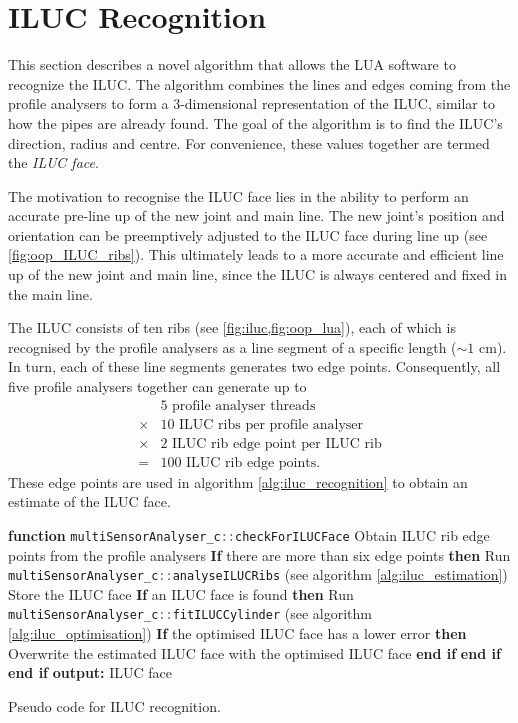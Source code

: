 \section{ILUC Recognition} \label{sec:iluc_recognition}
This section describes a novel algorithm that allows the LUA software to recognize the ILUC. The algorithm combines the lines and edges coming from the profile analysers to form a 3-dimensional representation of the ILUC, similar to how the pipes are already found. The goal of the algorithm is to find the ILUC's direction, radius and centre. For convenience, these values together are termed the \textit{ILUC face}.

The motivation to recognise the ILUC face lies in the ability to perform an accurate pre-line up of the new joint and main line. The new joint's position and orientation can be preemptively adjusted to the ILUC face during line up (see \ref{fig:oop_ILUC_ribs}). This ultimately leads to a more accurate and efficient line up of the new joint and main line, since the ILUC is always centered and fixed in the main line.

The ILUC consists of ten ribs (see \cref{fig:iluc,fig:oop_lua}), each of which is recognised by the profile analysers as a line segment of a specific length ($\sim 1$ cm). In turn, each of these line segments generates two edge points. Consequently, all five profile analysers together can generate up to
\begin{align*}
           & 5 \text{ profile analyser threads}         \\
    \times & 10 \text{ ILUC ribs per profile analyser}  \\
    \times & 2 \text{ ILUC rib edge point per ILUC rib} \\
    =      & 100 \text{ ILUC rib edge points}.
\end{align*}
These edge points are used in algorithm \ref{alg:iluc_recognition} to obtain an estimate of the ILUC face.
\begin{algorithm}
    \begin{algorithmic}[1]
        \State \textbf{function} \lstinline[language=C]|multiSensorAnalyser_c::checkForILUCFace|
        \State Obtain ILUC rib edge points from the profile analysers
        \State \textbf{If} there are more than six edge points \textbf{then}
        \State \quad Run \lstinline[language=C]|multiSensorAnalyser_c::analyseILUCRibs| (see algorithm \ref{alg:iluc_estimation})
        \State \quad Store the ILUC face
        \State \quad \textbf{If} an ILUC face is found \textbf{then}
        \State \quad \quad Run \lstinline[language=C]|multiSensorAnalyser_c::fitILUCCylinder| (see algorithm \ref{alg:iluc_optimisation})
        \State \quad \quad \textbf{If} the optimised ILUC face has a lower error \textbf{then}
        \State \quad \quad \quad Overwrite the estimated ILUC face with the optimised ILUC face
        \State \quad \quad \textbf{end if}
        \State \quad \textbf{end if}
        \State \textbf{end if}
        \State \textbf{output: } ILUC face
    \end{algorithmic}
    \caption{Pseudo code for ILUC recognition.}
    \label{alg:iluc_recognition}
\end{algorithm}


